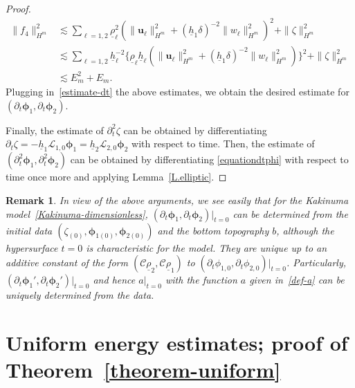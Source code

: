 \documentclass[11pt,leqno]{article}
\newtheorem{remark}[theorem]{\bf Remark}
\numberwithin{equation}{section}
\numberwithin{figure}{section}
\begin{document}
\begin{proof}
%
\begin{align*}
\|f_4\|_{H^m}^2
&\lesssim \sum_{\ell=1,2} \underline{\rho}_\ell^2 ( \|{\bm u}_\ell\|_{H^m}^2 + (\underline{h}_1\delta)^{-2} \|w_\ell\|_{H^m}^2 )^2
 + \|\zeta\|_{H^m}^2 \\
&\lesssim \sum_{\ell=1,2} \underline{h}_\ell^{-2} \{ \underline{\rho}_\ell\underline{h}_\ell
 ( \|{\bm u}_\ell\|_{H^m}^2 + (\underline{h}_1\delta)^{-2} \|w_\ell\|_{H^m}^2 ) \}^2 + \|\zeta\|_{H^m}^2 \\
&\lesssim E_m^2+E_m. 
\end{align*}
%
Plugging in~\eqref{estimate-dt} the above estimates, we obtain the desired estimate for $(\partial_t\bm{\phi}_1,\partial_t\bm{\phi}_2)$. 


Finally, the estimate of $\partial_t^2\zeta$ can be obtained by differentiating 
$\partial_t\zeta=-\underline{h}_1\mathcal{L}_{1,0}\bm{\phi}_1=\underline{h}_2\mathcal{L}_{2,0}\bm{\phi}_2$ 
with respect to time. 
Then, the estimate of $(\partial_t^2\bm{\phi}_1,\partial_t^2\bm{\phi}_2)$ can be obtained by differentiating 
\eqref{equationdtphi} with respect to time once more and applying Lemma~\ref{L.elliptic}. 
\end{proof}


\begin{remark}\label{remark-ID}
{\rm
In view of the above arguments, we see easily that for the Kakinuma model~\eqref{Kakinuma-dimensionless}, 
$(\partial_t\bm{\phi}_1, \partial_t\bm{\phi}_2)|_{t=0}$ can be determined from the initial data 
$(\zeta_{(0)},\bm{\phi}_{1(0)},\bm{\phi}_{2(0)})$ and the bottom topography $b$, although the hypersurface $t=0$ is characteristic for the model. 
They are unique up to an additive constant of the form $(\mathcal{C}\underline{\rho}_2,\mathcal{C}\underline{\rho}_1)$ 
to $(\partial_t\phi_{1,0},\partial_t\phi_{2,0})|_{t=0}$. 
Particularly, $(\partial_t\bm{\phi}_1', \partial_t\bm{\phi}_2')|_{t=0}$ and hence $a|_{t=0}$ with the function 
$a$ given in~\eqref{def-a} can be uniquely determined from the data. 
}
\end{remark}


\section{Uniform energy estimates; proof of Theorem~\ref{theorem-uniform}}\label{S.hyperbolic}
\end{document}
